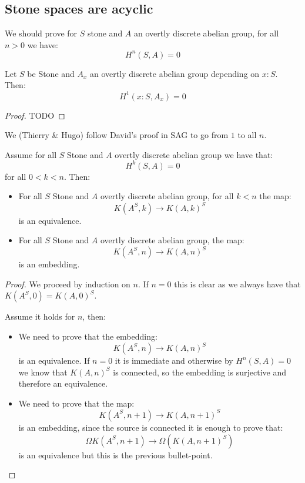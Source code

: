 \subsection{Stone spaces are acyclic}

We should prove for $S$ stone and $A$ an overtly discrete abelian group, for all $n>0$ we have:
\[H^n(S,A) = 0\]

\begin{lemma}\label{vanishing-1-cohomology-stone}
Let $S$ be Stone and $A_x$ an overtly discrete abelian group depending on $x:S$. Then:
\[H^1(x:S,A_x) = 0\]
\end{lemma}

\begin{proof}
TODO
\end{proof}

We (Thierry \& Hugo) follow David's proof in SAG to go from $1$ to all $n$.

\begin{lemma}\label{eilenberg-exponentials-auxiliary}
Assume for all $S$ Stone and $A$ overtly discrete abelian group we have that:
\[H^k(S,A) = 0\] 
for all $0<k<n$. Then:
\begin{itemize}
\item For all $S$ Stone and $A$ overtly discrete abelian group, for all $k<n$ the map:
\[K(A^S,k) \to K(A,k)^S\]
is an equivalence.
\item For all $S$ Stone and $A$ overtly discrete abelian group, the map:
\[K(A^S,n) \to K(A,n)^S\]
is an embedding.
\end{itemize}
\end{lemma}

\begin{proof}
We proceed by induction on $n$. If $n=0$ this is clear as we always have that $K(A^S,0) = K(A,0)^S$.

Assume it holds for $n$, then:
\begin{itemize} 
\item We need to prove that the embedding:
\[K(A^S,n) \to K(A,n)^S\]
is an equivalence. If $n=0$ it is immediate and otherwise by $H^n(S,A)=0$ we know that $K(A,n)^S$ is connected, so the embedding is surjective and therefore an equivalence. 
\item We need to prove that the map:
\[K(A^S,n+1) \to K(A,n+1)^S\]
is an embedding, since the source is connected it is enough to prove that:
\[\Omega K(A^S,n+1) \to \Omega (K(A,n+1)^S)\]
is an equivalence but this is the previous bullet-point.
\end{itemize}
\end{proof}

